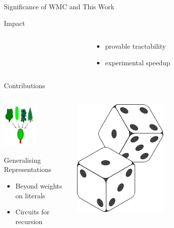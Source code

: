 \documentclass{beamer}
\begin{document}
\begin{frame}{Significance of WMC and This Work}
\begin{block}{Impact}
\begin{columns}
\begin{column}{0.1\textwidth}
      \end{column}
      \begin{column}{0.40\textwidth}
        \begin{itemize}
          \item provable tractability
          \item experimental speedup
        \end{itemize}
      \end{column}
    \end{columns}
  \end{block}
\end{frame}

\begin{frame}{Contributions}
  \begin{columns}[t]
    \begin{column}{0.46\textwidth}
      \centering
      \includegraphics[width=0.5\textwidth]{trees.png}
      \begin{block}{Generalising Representations}
        \begin{itemize}
          \item Beyond weights on literals
          \item Circuits for recursion
        \end{itemize}
      \end{block}
    \end{column}
    \begin{column}{0.54\textwidth}
      \centering
      \includegraphics[width=0.5\textwidth]{dice}

\end{column}
\end{columns}
\end{frame}
\end{document}
